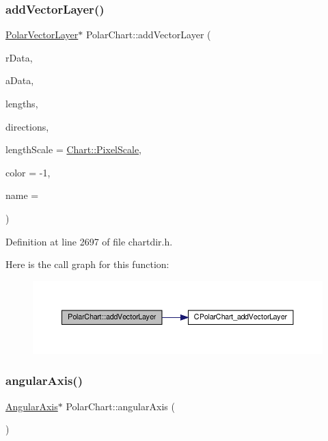 \subsubsection{\texorpdfstring{add\+Vector\+Layer()}{addVectorLayer()}}
{\footnotesize\ttfamily \hyperlink{class_polar_vector_layer}{Polar\+Vector\+Layer}$\ast$ Polar\+Chart\+::add\+Vector\+Layer (\begin{DoxyParamCaption}\item[{\hyperlink{class_double_array}{Double\+Array}}]{r\+Data,  }\item[{\hyperlink{class_double_array}{Double\+Array}}]{a\+Data,  }\item[{\hyperlink{class_double_array}{Double\+Array}}]{lengths,  }\item[{\hyperlink{class_double_array}{Double\+Array}}]{directions,  }\item[{int}]{length\+Scale = {\ttfamily \hyperlink{namespace_chart_af8005281e1fb57d737e9f89b13605808afebebf69a28e58958dc5f9da3ece2147}{Chart\+::\+Pixel\+Scale}},  }\item[{int}]{color = {\ttfamily -\/1},  }\item[{const char $\ast$}]{name = {} }\end{DoxyParamCaption})\hspace{0.3cm}{\ttfamily [inline]}}



Definition at line 2697 of file chartdir.\+h.

Here is the call graph for this function\+:
\nopagebreak
\begin{figure}[H]
\begin{center}
\leavevmode
\includegraphics[width=350pt]{class_polar_chart_a23fe6742c905e05ba49aaca646aef921_cgraph}
\end{center}
\end{figure}
\mbox{\label{class_polar_chart_ab8bf9e2fdc266ee0e8a5e878e3e80cde}} 
\subsubsection{\texorpdfstring{angular\+Axis()}{angularAxis()}}
{\footnotesize\ttfamily \hyperlink{class_angular_axis}{Angular\+Axis}$\ast$ Polar\+Chart\+::angular\+Axis (\begin{DoxyParamCaption}{ }\end{DoxyParamCaption})\hspace{0.3cm}{\ttfamily [inline]}}



